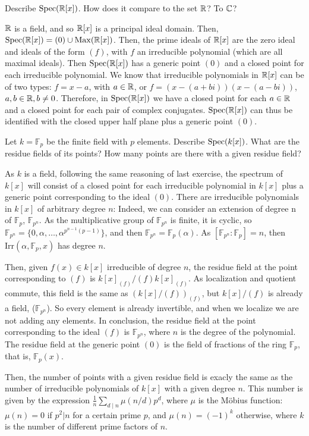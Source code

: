 \begin{ex}
	Describe $\mathrm{Spec}(\mathbb{R}[x])$. How does it compare to the set $\mathbb{R}$? To $\mathbb{C}$?
\end{ex}

\begin{sol}
	$\mathbb{R}$ is a field, and so $\mathbb{R}[x]$ is a principal ideal domain. Then, $\mathrm{Spec}(\mathbb{R}[x]) = (0) \cup \mathrm{Max}(\mathbb{R}[x])$. Then, the prime ideals of $\mathbb{R}[x]$ are the zero ideal and ideals of the form $(f)$, with $f$ an irreducible polynomial (which are all maximal ideals). Then $\mathrm{Spec}(\mathbb{R}[x])$ has a generic point $(0)$ and a closed point for each irreducible polynomial. We know that irreducible polynomials in $\mathbb{R}[x]$ can be of two types: $f = x-a$, with $a \in \mathbb{R}$, or $f = (x-(a+bi))(x-(a-bi))$, $a,b \in \mathbb{R}, b \neq 0$. Therefore, in $\mathrm{Spec}(\mathbb{R}[x])$ we have a closed point for each $a \in \mathbb{R}$ and a closed point for each pair of complex conjugates. $\mathrm{Spec}(\mathbb{R}[x])$ can thus be identified with the closed upper half plane plus a generic point $(0)$.
\end{sol}

\begin{ex}
	Let $k = \mathbb{F}_p$ be the finite field with $p$ elements. Describe $\mathrm{Spec} (k[x])$. What are the residue fields of its points? How many points are there with a given residue field?
\end{ex}

\begin{sol}
	As $k$ is a field, following the same reasoning of last exercise, the spectrum of $k[x]$ will consist of a closed point for each irreducible polynomial in $k[x]$ plus a generic point corresponding to the ideal $(0)$. There are irreducible polynomials in $k[x]$ of arbitrary degree $n$: Indeed, we can consider an extension of degree n of $\mathbb{F}_p$, $\mathbb{F}_{p^n}$. As the multiplicative group of $\mathbb{F}_{p^n}$ is finite, it is cyclic, so $\mathbb{F}_{p^n} = \{0, \alpha, \dots, \alpha^{p^{n-1}(p-1)} \}$, and then $\mathbb{F}_{p^n} = \mathbb{F}_p(\alpha)$. As $[\mathbb{F}_{p^n} : \mathbb{F}_p] = n$, then $\text{Irr}(\alpha, \mathbb{F}_p, x)$ has degree $n$.

	Then, given $f(x) \in k[x]$ irreducible of degree $n$, the residue field at the point corresponding to $(f)$ is $k[x]_{(f)} / (f)k[x]_{(f)}$. As localization and quotient commute, this field is the same as $(k[x]/(f))_{(f)}$, but $k[x]/(f)$ is already a field, ($\mathbb{F}_{p^n}$). So every element is already invertible, and when we localize we are not adding any elements. In conclusion, the residue field at the point corresponding to the ideal $(f)$ is $\mathbb{F}_{p^n}$, where $n$ is the degree of the polynomial. The residue field at the generic point $(0)$ is the field of fractions of the ring $\mathbb{F}_p$, that is, $\mathbb{F}_p(x)$. 

	Then, the number of points with a given residue field is exacly the same as the number of irreducible polynomials of $k[x]$ with a given degree $n$. This number is given by the expression $\frac{1}{n} \sum_{d \mid n} \mu(n/d) p^d$, where $\mu$ is the Möbius function: $\mu(n) = 0$ if $p^2 | n$ for a certain prime $p$, and $\mu(n) = (-1)^k$ otherwise, where $k$ is the number of different prime factors of $n$.
\end{sol}

